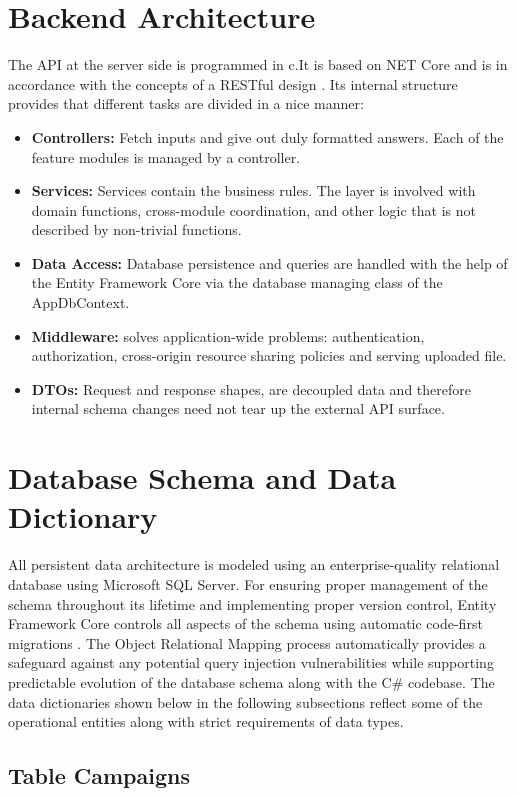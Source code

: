 \documentclass{thesis-library}
\begin{document}
\section{Backend Architecture}
The API at the server side is programmed in c.It is based on NET Core and is in accordance with the concepts of a RESTful design \cite{masse2011rest}. Its internal structure provides that different tasks are divided in a nice manner:
\begin{itemize}
    \item \textbf{Controllers:} Fetch inputs and give out duly formatted answers. Each of the feature modules is managed by a controller.
    \item \textbf{Services:} Services contain the business rules. The layer is involved with domain functions, cross-module coordination, and other logic that is not described by non-trivial functions.
    \item \textbf{Data Access:} Database persistence and queries are handled with the help of the Entity Framework Core via the database managing class of the AppDbContext.
    \item \textbf{Middleware:} solves application-wide problems: authentication, authorization, cross-origin resource sharing policies and serving uploaded file.
    \item \textbf{DTOs:} Request and response shapes, are decoupled data and therefore internal schema changes need not tear up the external API surface.
\end{itemize}

\section{Database Schema and Data Dictionary}
All persistent data architecture is modeled using an enterprise-quality relational database using Microsoft SQL Server. For ensuring proper management of the schema throughout its lifetime and implementing proper version control, Entity Framework Core controls all aspects of the schema using automatic code-first migrations \cite{coronel2016database}. The Object Relational Mapping process automatically provides a safeguard against any potential query injection vulnerabilities while supporting predictable evolution of the database schema along with the C\# codebase. The data dictionaries shown below in the following subsections reflect some of the operational entities along with strict requirements of data types.

\subsection{Table Campaigns}
\end{document}
